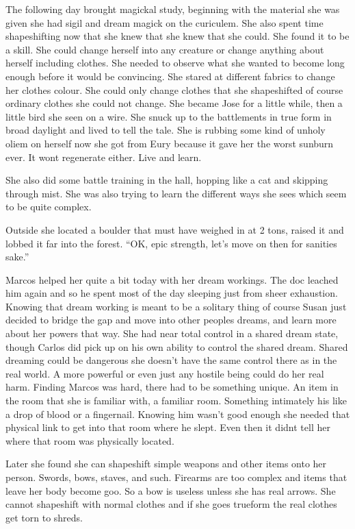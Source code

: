 The following day brought magickal study, beginning with the material she was given she had sigil and dream magick on the curiculem. She also spent time shapeshifting now that she knew that she knew that she could. She found it to be a skill. She could change herself into any creature or change anything about herself including clothes. She needed to observe what she wanted to become long enough before it would be convincing. She stared at different fabrics to change her clothes colour. She could only change clothes that she shapeshifted of course ordinary clothes she could not change. She became Jose for a little while, then a little bird she seen on a wire. She snuck up to the battlements in true form in broad daylight and lived to tell the tale. She is rubbing some kind of unholy oliem on herself now she got from Eury because it gave her the worst sunburn ever. It wont regenerate either. Live and learn.

She also did some battle training in the hall, hopping like a cat and skipping through mist. She was also trying to learn the different ways she sees which seem to be quite complex.

Outside she located a boulder that must have weighed in at 2 tons, raised it and lobbed it far into the forest. ``OK, epic strength, let's move on then for sanities sake.''

Marcos helped her quite a bit today with her dream workings. The doc leached him again and so he spent most of the day sleeping just from sheer exhaustion. Knowing that dream working is meant to be a solitary thing of course Susan just decided to bridge the gap and move into other peoples dreams,  and learn more about her powers that way. She had near total control in a shared dream state, though Carlos did pick up on his own ability to control the shared dream. Shared dreaming could be dangerous she doesn't have the same control there as in the real world. A more powerful or even just any hostile being could do her real harm. Finding Marcos was hard, there had to be something unique. An item in the room that she is familiar with, a familiar room. Something intimately his like a drop of blood or a fingernail. Knowing him wasn't good enough she needed that physical link to get into that room where he slept. Even then it didnt tell her where that room was physically located.

Later she found she can shapeshift simple weapons and other items onto her person. Swords, bows, staves, and such. Firearms are too complex and items that leave her body become goo. So a bow is useless unless she has real arrows. She cannot shapeshift with normal clothes and if she goes trueform the real clothes get torn to shreds.


